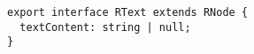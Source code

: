 \begin{verbatim}
export interface RText extends RNode {
  textContent: string | null;
}
\end{verbatim}
